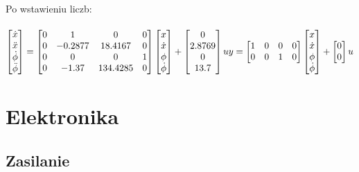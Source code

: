 \documentclass[a4paper,12pt,twoside,openany]{report}
\begin{document}
\noindent Po wstawieniu liczb:\\
\\$
     \begin{bmatrix}
       \dot{x} \\
       \ddot{x} \\
       \dot{\phi} \\
       \ddot{\phi}
     \end{bmatrix}
     =
     \begin{bmatrix}
       0 & 1 & 0 & 0          \\
       0 & -0.2877 & 18.4167 & 0 \\
       0 & 0 & 0 & 1 \\
       0 & -1.37 & 134.4285 & 0 
     \end{bmatrix}
     \begin{bmatrix}
       x \\
       \dot{x} \\
       \phi \\
       \dot{\phi}
     \end{bmatrix}
     +
     \begin{bmatrix}
       0 \\
       2.8769 \\
       0 \\
       13.7
     \end{bmatrix}
     u\\
     y=
     \begin{bmatrix}
       1 & 0 & 0 & 0 \\
       0 & 0 & 1 & 0 
     \end{bmatrix}
     \begin{bmatrix}
       x \\
       \dot{x} \\
       \phi \\
       \dot{\phi}
     \end{bmatrix}
     +
     \begin{bmatrix}
       0 \\
       0 
     \end{bmatrix}
     u
$


\chapter{Elektronika}

\section{Zasilanie}
\end{document}
